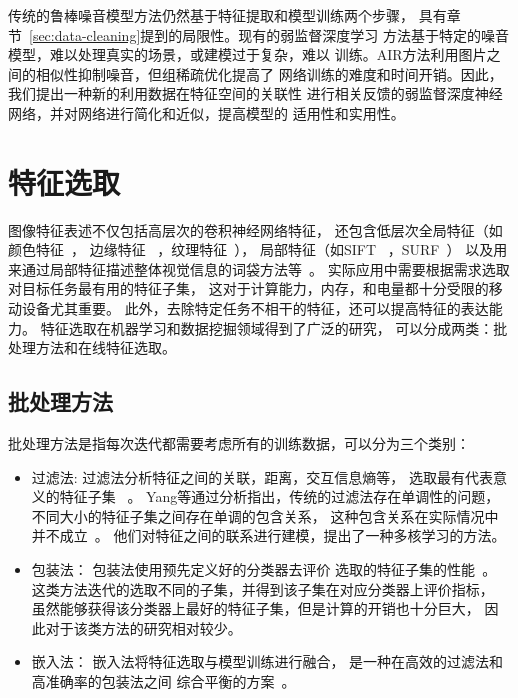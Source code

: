 传统的鲁棒噪音模型方法仍然基于特征提取和模型训练两个步骤，
具有章节~\ref{sec:data-cleaning}提到的局限性。现有的弱监督深度学习
方法基于特定的噪音模型，难以处理真实的场景，或建模过于复杂，难以
训练。AIR方法利用图片之间的相似性抑制噪音，但组稀疏优化提高了
网络训练的难度和时间开销。因此，我们提出一种新的利用数据在特征空间的关联性
进行相关反馈的弱监督深度神经网络，并对网络进行简化和近似，提高模型的
适用性和实用性。

\section{特征选取}
图像特征表述不仅包括高层次的卷积神经网络特征，
还包含低层次全局特征（如颜色特征~\cite{jain1996image}，
边缘特征~\cite{jain1996image} ，纹理特征~\cite{manjunath1996texture}），
局部特征（如SIFT~\cite{lowe1999object} ，SURF~\cite{bay2006surf}）
以及用来通过局部特征描述整体视觉信息的词袋方法等~\cite{yang2007evaluating}。
实际应用中需要根据需求选取对目标任务最有用的特征子集，
这对于计算能力，内存，和电量都十分受限的移动设备尤其重要。
此外，去除特定任务不相干的特征，还可以提高特征的表达能力。
特征选取在机器学习和数据挖掘领域得到了广泛的研究，
可以分成两类：批处理方法和在线特征选取。

\subsection{批处理方法}
批处理方法是指每次迭代都需要考虑所有的训练数据，可以分为三个类别：
\begin{itemize}
    \item 过滤法: 过滤法分析特征之间的关联，距离，交互信息熵等，
        选取最有代表意义的特征子集~\cite{yu2003feature,jiang2015relative,li2016feature} 。
        Yang等通过分析指出，传统的过滤法存在单调性的问题，
        不同大小的特征子集之间存在单调的包含关系，
        这种包含关系在实际情况中并不成立~\cite{yang2013efficient}。
        他们对特征之间的联系进行建模，提出了一种多核学习的方法。
    \item 包装法： 包装法使用预先定义好的分类器去评价
        选取的特征子集的性能~\cite{kohavi1997wrappers}。
        这类方法迭代的选取不同的子集，并得到该子集在对应分类器上评价指标，
        虽然能够获得该分类器上最好的特征子集，但是计算的开销也十分巨大，
        因此对于该类方法的研究相对较少。
    \item 嵌入法： 嵌入法将特征选取与模型训练进行融合，
        是一种在高效的过滤法和高准确率的包装法之间
        综合平衡的方案~\cite{pappu2015sparse,le2014feature}。
\end{itemize}

